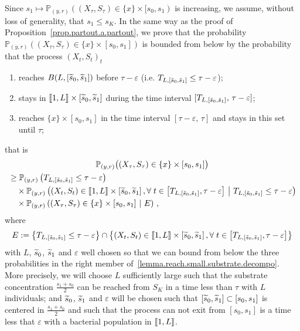 \documentclass[AHL,Unicode,longabstracts,published]{cedram}
\newcommand{\llbracket}{\mathopen{[\mkern -2.7mu[}}
\newcommand{\rrbracket}{\mathclose{]\mkern -2.7mu]}}
\newcommand{\PP}{\mathbb{P}}
\newcommand{\setunL}{\llbracket 1, L\rrbracket}
\newcommand{\1}{\mathbf{1}}
\let\oldtilde\tilde
\renewcommand*{\tilde}[1]{\mathchoice{\widetilde{#1}}{\widetilde{#1}}{\oldtilde{#1}}{\oldtilde{#1}}}
\let\oldforall\forall
\renewcommand*{\forall}{\mathrel{\oldforall}}
\begin{document}
Since $s_1\mapsto \PP_{(y,r)}((X_{\tau},S_{\tau})\in \{x\}\times [s_0,s_1)$ is increasing, we assume, without loss of generality, that $s_1\leq s_K$. In the same way as the proof of Proposition~\ref{prop.partout.a.partout}, we prove that the probability $\PP_{(y,r)}((X_\tau,S_\tau)\in\{x\}\times [s_0,s_1])$ is bounded from below by the probability that the process $(X_t,S_t)_t$
\begin{enumerate}
\item reaches $B(L,[\tilde s_0,\tilde s_1])$ before $\tau-\varepsilon$ (i.e. $T_{L,[\tilde s_0,\tilde s_1]}\leq \tau-\varepsilon$);
\item stays in $\llbracket 1, L \rrbracket \times [\tilde s_0,\tilde s_1]$ during the time interval $[T_{L,[\tilde s_0,\tilde s_1]},\, \tau-\varepsilon]$;
\item reaches $\{x\}\times [s_0,s_1]$ in the time interval $[\tau-\varepsilon,\,\tau]$ and stays in this set until $\tau$;
\end{enumerate}
that is
\begin{multline}\label{lemma.reach.small.substrate.decompo}
\PP_{(y,r)}\big((X_\tau,S_\tau)\in\{x\}\times [s_0,s_1]\big)\\
\begin{aligned}
&\geq \PP_{(y,r)}\left(T_{L,\left[\tilde s_0,\tilde s_1\right]}\leq \tau-\varepsilon\right)\,
\\
&\quad\times \PP_{(y,r)}
\left((X_t,S_t)\in \llbracket 1, L \rrbracket \times \left[\tilde s_0,\tilde s_1\right],
\forall t\in \left[T_{L,\left[\tilde s_0,\tilde s_1\right]},\tau-\varepsilon\right]\ \middle| \ T_{L,[\tilde s_0,\tilde s_1]}\leq \tau-\varepsilon \right)
\\ 
&\quad\times \PP_{(y,r)}
\left((X_\tau,S_\tau)\in\{x\}\times [s_0,s_1] \ \middle| \ E \right)\,,
\end{aligned}
\end{multline}
where
\[
E:= \left\{T_{L,\left[\tilde s_0,\tilde s_1\right]}\leq \tau-\varepsilon\right\} \cap
\left\{\left(X_t,S_t\right)\in \llbracket 1, L \rrbracket \times \left[\tilde s_0,\tilde s_1\right],
\forall t\in \left[T_{L,\left[\tilde s_0,\tilde s_1\right]},\tau-\varepsilon\right]\right\}
\]
with $L$, $\tilde s_0$, $\tilde s_1$ and $\varepsilon$ well chosen so that we can bound from below the three probabilities in the right member of~\eqref{lemma.reach.small.substrate.decompo}. More precisely, we will choose $L$ sufficiently large such that the substrate concentration $\frac{s_1+s_0}{2}$ can be reached from $S_K$ in a time less than $\tau$ with $L$ individuals; and $\tilde s_0$, $\tilde s_1$ and $\varepsilon$ will be chosen such that $[\tilde s_0, \tilde s_1]\subset [s_0,s_1]$ is centered in $\frac{s_1+s_0}{2}$ and such that the process can not exit from $[s_0,s_1]$ is a time less that $\varepsilon$ with a bacterial population in $\setunL$.
\end{document}
